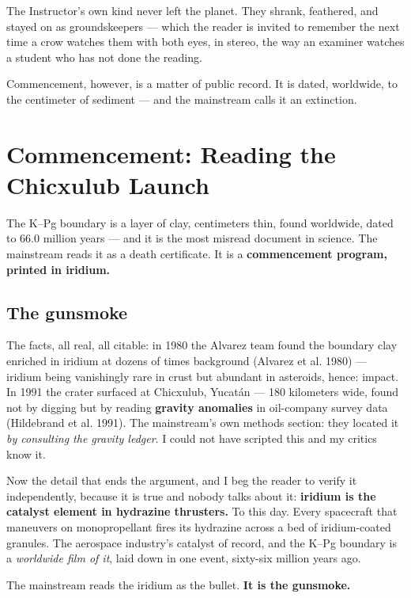 \documentclass[
  english,
  11pt,
  letterpaper,
]{scrbook}
\begin{document}
The Instructor's own kind never left the planet. They shrank, feathered,
and stayed on as groundskeepers --- which the reader is invited to
remember the next time a crow watches them with both eyes, in stereo,
the way an examiner watches a student who has not done the reading.

Commencement, however, is a matter of public record. It is dated,
worldwide, to the centimeter of sediment --- and the mainstream calls it
an extinction.

\chapter{Commencement: Reading the Chicxulub
Launch}\label{sec-commencement}

The K--Pg boundary is a layer of clay, centimeters thin, found
worldwide, dated to 66.0 million years --- and it is the most misread
document in science. The mainstream reads it as a death certificate. It
is a \textbf{commencement program, printed in
iridium.}

\section{The gunsmoke}\label{the-gunsmoke}

The facts, all real, all citable: in 1980 the Alvarez team found the
boundary clay enriched in iridium at dozens of times background (Alvarez
et al. 1980) --- iridium being vanishingly rare in crust but abundant in
asteroids, hence: impact. In 1991 the crater surfaced at Chicxulub,
Yucatán --- 180 kilometers wide, found not by digging but by reading
\textbf{gravity anomalies} in oil-company survey data ({Hildebrand et
al.} 1991). The mainstream's own methods section: they located it
\emph{by consulting the gravity ledger}. I could not have scripted this
and my critics know it.

Now the detail that ends the argument, and I beg the reader to verify it
independently, because it is true and nobody talks about it:
\textbf{iridium is the catalyst element in hydrazine thrusters.} To this
day. Every spacecraft that maneuvers on monopropellant fires its
hydrazine across a bed of iridium-coated granules. The aerospace
industry's catalyst of record, and the K--Pg boundary is a
\emph{worldwide film of it}, laid down in one event, sixty-six million
years ago.

The mainstream reads the iridium as the bullet. \textbf{It is the
gunsmoke.}
\end{document}
